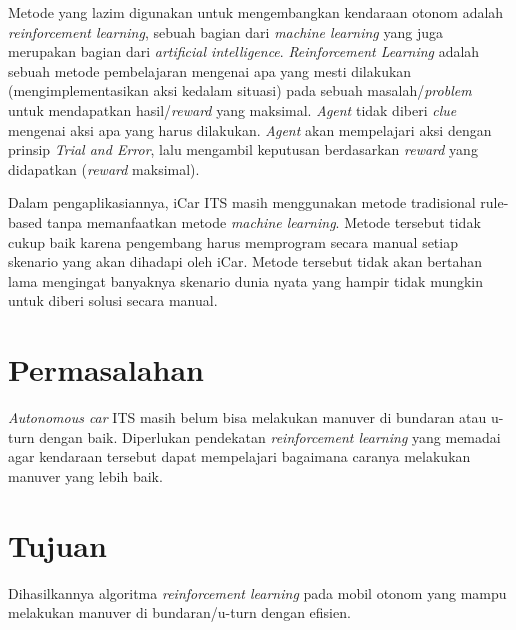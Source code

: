 Metode yang lazim digunakan untuk mengembangkan kendaraan otonom adalah \textit{reinforcement learning}, sebuah bagian dari \textit{machine learning }yang juga merupakan bagian dari \textit{artificial intelligence}. \textit{Reinforcement Learning }adalah sebuah metode pembelajaran mengenai apa yang mesti dilakukan (mengimplementasikan aksi kedalam situasi) pada sebuah masalah/\textit{problem }untuk mendapatkan hasil/\textit{reward }yang maksimal. \textit{Agent }tidak diberi \textit{clue }mengenai aksi apa yang harus dilakukan. \textit{Agent }akan mempelajari aksi dengan prinsip \textit{Trial and Error}, lalu mengambil keputusan berdasarkan \textit{reward }yang didapatkan (\textit{reward }maksimal).

Dalam pengaplikasiannya, iCar ITS masih menggunakan metode tradisional rule-based tanpa memanfaatkan metode \textit{machine learning}. Metode tersebut tidak cukup baik karena pengembang harus memprogram secara manual setiap skenario yang akan dihadapi oleh iCar. Metode tersebut tidak akan bertahan lama mengingat banyaknya skenario dunia nyata yang hampir tidak mungkin untuk diberi solusi secara manual.

\section{Permasalahan}
\label{sec:permasalahan}

\textit{Autonomous car }ITS masih belum bisa melakukan manuver di bundaran atau u-turn dengan baik. Diperlukan pendekatan \textit{reinforcement learning }yang memadai agar kendaraan tersebut dapat mempelajari bagaimana caranya melakukan manuver yang lebih baik.
	


\section{Tujuan}
\label{sec:Tujuan}

Dihasilkannya algoritma \textit{reinforcement learning }pada mobil otonom yang mampu melakukan manuver di bundaran/u-turn dengan efisien.

\iffalse	
\begin{enumerate}[nolistsep]
	\item Dihasilkannya algoritma \textit{reinforcement learning }pada mobil otonom yang mampu melakukan manuver di bundaran/u-turn dengan efisien.

	\item Mengetahui fitur-fitur apa saja yang dibutuhkan oleh \textit{autonomus car }agar output maksimal.
	
	Dapat dicontohkan seperti dimana lokasi dan berapa derajat kemiringan dari sensor pada kendaraan yang sebaiknya diaplikasikan.
	
\end{enumerate}
\fi


